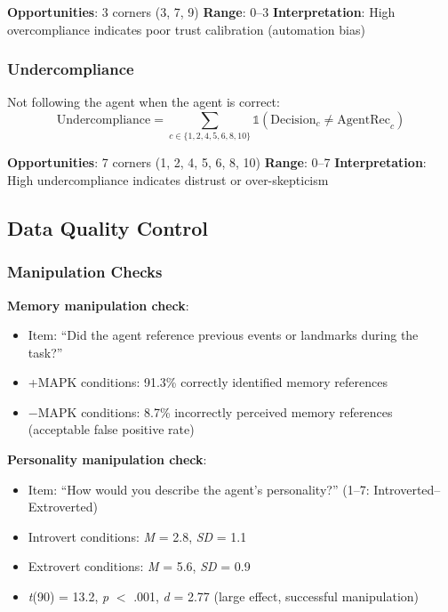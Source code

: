 \documentclass[12pt]{article}
\begin{document}
\textbf{Opportunities}: 3 corners (3, 7, 9)
\textbf{Range}: 0--3
\textbf{Interpretation}: High overcompliance indicates poor trust calibration (automation bias)

\subsubsection{Undercompliance}

Not following the agent when the agent is correct:
\begin{equation}
\text{Undercompliance} = \sum_{c \in \{1,2,4,5,6,8,10\}} \mathbb{1}(\text{Decision}_c \neq \text{AgentRec}_c)
\end{equation}

\textbf{Opportunities}: 7 corners (1, 2, 4, 5, 6, 8, 10)
\textbf{Range}: 0--7
\textbf{Interpretation}: High undercompliance indicates distrust or over-skepticism

\subsection{Data Quality Control}

\subsubsection{Manipulation Checks}

\textbf{Memory manipulation check}:
\begin{itemize}
    \item Item: ``Did the agent reference previous events or landmarks during the task?''
    \item +MAPK conditions: 91.3\% correctly identified memory references
    \item $-$MAPK conditions: 8.7\% incorrectly perceived memory references (acceptable false positive rate)
\end{itemize}

\textbf{Personality manipulation check}:
\begin{itemize}
    \item Item: ``How would you describe the agent's personality?'' (1--7: Introverted--Extroverted)
    \item Introvert conditions: \textit{M} = 2.8, \textit{SD} = 1.1
    \item Extrovert conditions: \textit{M} = 5.6, \textit{SD} = 0.9
    \item \textit{t}(90) = 13.2, \textit{p} $<$ .001, \textit{d} = 2.77 (large effect, successful manipulation)
\end{itemize}
\end{document}

